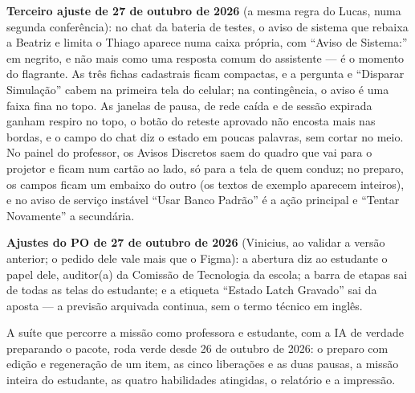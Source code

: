 \textbf{Terceiro ajuste de 27 de outubro de 2026} (a mesma regra do Lucas,
numa segunda conferência): no chat da bateria de testes, o aviso de sistema
que rebaixa a Beatriz e limita o Thiago aparece numa caixa própria, com
\enquote{Aviso de Sistema:} em negrito, e não mais como uma resposta comum
do assistente --- é o momento do flagrante. As três fichas cadastrais ficam
compactas, e a pergunta e \enquote{Disparar Simulação} cabem na primeira
tela do celular; na contingência, o aviso é uma faixa fina no topo. As
janelas de pausa, de rede caída e de sessão expirada ganham respiro no
topo, o botão do reteste aprovado não encosta mais nas bordas, e o campo do
chat diz o estado em poucas palavras, sem cortar no meio. No painel do
professor, os Avisos Discretos saem do quadro que vai para o projetor e
ficam num cartão ao lado, só para a tela de quem conduz; no preparo, os
campos ficam um embaixo do outro (os textos de exemplo aparecem inteiros),
e no aviso de serviço instável \enquote{Usar Banco Padrão} é a ação
principal e \enquote{Tentar Novamente} a secundária.

\textbf{Ajustes do PO de 27 de outubro de 2026} (Vinicius, ao validar a
versão anterior; o pedido dele vale mais que o Figma): a abertura diz ao
estudante o papel dele, auditor(a) da Comissão de Tecnologia da escola; a
barra de etapas sai de todas as telas do estudante; e a etiqueta
\enquote{Estado Latch Gravado} sai da aposta --- a previsão arquivada
continua, sem o termo técnico em inglês.

A suíte que percorre a missão como professora e estudante, com a IA de
verdade preparando o pacote, roda verde desde 26 de outubro de 2026: o
preparo com edição e regeneração de um item, as cinco liberações e as duas
pausas, a missão inteira do estudante, as quatro habilidades atingidas, o
relatório e a impressão.

